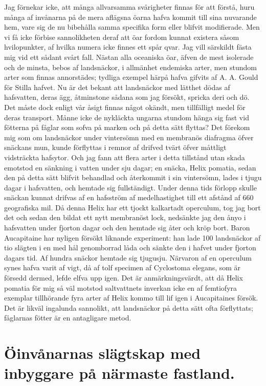 Jag förnekar icke, att många allvarsamma svårigheter finnas för att förstå, huru många af invånarna på de mera aflägsna öarna hafva kommit till sina nuvarande hem, vare sig de nu bibehålla samma specifika form eller blifvit modifierade. Men vi få icke förbise sannolikheten deraf att öar fordom kunnat existera såsom hvilopunkter, af hvilka numera icke finnes ett spår qvar. Jag vill särskildt fästa mig vid ett sådant svårt fall. Nästan alla oceaniska öar, äfven de mest isolerade och de minsta, bebos af landsnäckor, i allmänhet endemiska arter, men stundom arter som finnas annorstädes; tydliga exempel härpå hafva gifvits af A. A. Gould för Stilla hafvet. Nu är det bekant att landsnäckor med lätthet dödas af hafsvatten, deras ägg, åtminstone sådana som jag försökt, spricka deri och dö. Det måste dock enligt vår åsigt finnas något okändt, men tillfälligt medel för deras transport. Månne icke de nykläckta ungarna stundom hänga sig fast vid fötterna på fåglar som sofva på marken och på detta sätt flyttas? Det förekom mig som om landsnäckor under vintersömn med en membranös diafragma öfver snäckans mun, kunde förflyttas i remnor af drifved tvärt öfver måttligt vidsträckta hafsytor. Och jag fann att flera arter i detta tillstånd utan skada emotstod en sänkning i vatten under sju dagar; en snäcka, Helix pomatia, sedan den på detta sätt blifvit behandlad och återkommit i sin vintersömn, lades i tjugu dagar i hafsvatten, och hemtade sig fullständigt. Under denna tids förlopp skulle snäckan kunnat drifvas af en hafsström af medelhastighet till ett afstånd af 660 geografiska mil. Då denna Helix har ett tjockt kalkartadt operculum, tog jag bort det och sedan den bildat ett nytt membranöst lock, nedsänkte jag den ånyo i hafsvatten under fjorton dagar och den hemtade sig åter och kröp bort. Baron Aucapitaine har nyligen försökt liknande experiment: han lade 100 landsnäckor af tio slägten i en med hål genomborrad låda och sänkte den i hafvet under fjorton dagars tid. Af hundra snäckor hemtade sig tjugusju. Närvaron af en operculum synes hafva varit af vigt, då af tolf specimen af Cyclostoma elegans, som är försedd dermed, lefde elfva upp igen. Det är anmärkningsvärdt, att då Helix pomatia för mig så väl motstod saltvattnets inverkan icke en af femtiofyra exemplar tillhörande fyra arter af Helix kommo till lif igen i Aucapitaines försök. Det är likväl ingalunda sannolikt, att landsnäckor på detta sätt ofta förflyttats; fåglarnas fötter är en antagligare metod.



\section[Öinvånares slägtskap]{Öinvånarnas slägtskap med inbyggare på närmaste
fastland.}


